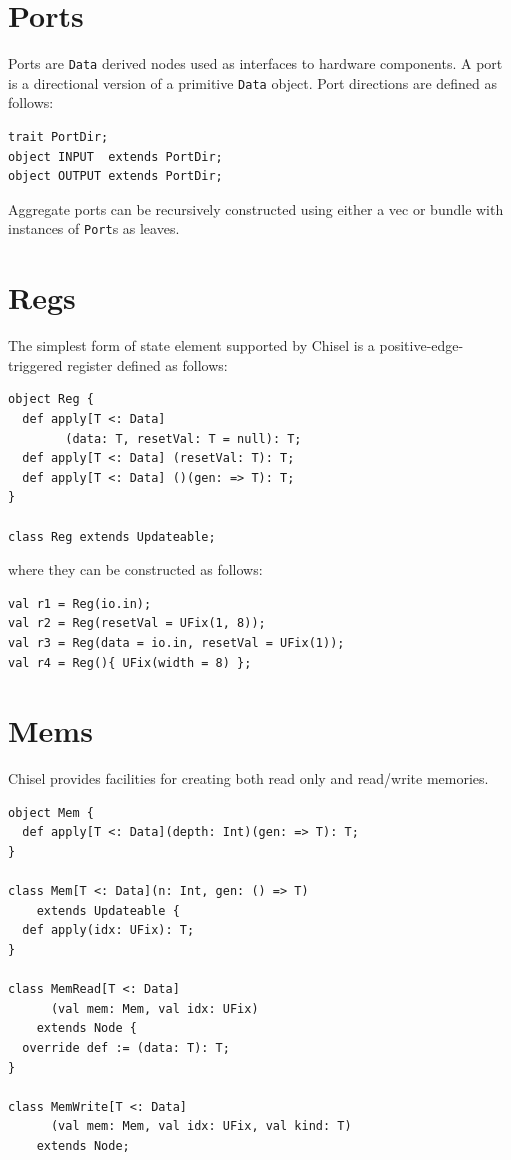\documentclass[10pt,twocolumn]{article}
\def\code#1{{\small\tt #1}}
\begin{document}
\section{Ports}
\label{sec:ports}

Ports are \code{Data} derived nodes used as interfaces to hardware
components.   A port is a directional version of a primitive
\code{Data} object.  Port directions are defined as follows:

\begin{lstlisting}
trait PortDir;
object INPUT  extends PortDir;
object OUTPUT extends PortDir;
\end{lstlisting}

\noindent
Aggregate ports can be recursively constructed using either a vec or
bundle with instances of \code{Port}s as leaves.  

\section{Regs}

The simplest form of state element supported by Chisel is a
positive-edge-triggered register defined as follows:

\begin{lstlisting}
object Reg {
  def apply[T <: Data]
        (data: T, resetVal: T = null): T;
  def apply[T <: Data] (resetVal: T): T;
  def apply[T <: Data] ()(gen: => T): T;
}
 
class Reg extends Updateable;
\end{lstlisting}

\noindent
where they can be constructed as follows:

\begin{lstlisting}
val r1 = Reg(io.in);
val r2 = Reg(resetVal = UFix(1, 8));
val r3 = Reg(data = io.in, resetVal = UFix(1));
val r4 = Reg(){ UFix(width = 8) };
\end{lstlisting}

\section{Mems}

Chisel provides facilities for creating both read only and
read/write memories.  

\begin{lstlisting}
object Mem {
  def apply[T <: Data](depth: Int)(gen: => T): T;
}

class Mem[T <: Data](n: Int, gen: () => T) 
    extends Updateable {
  def apply(idx: UFix): T;
}

class MemRead[T <: Data]
      (val mem: Mem, val idx: UFix) 
    extends Node {
  override def := (data: T): T;
}

class MemWrite[T <: Data]
      (val mem: Mem, val idx: UFix, val kind: T) 
    extends Node;
\end{lstlisting}
\end{document}
